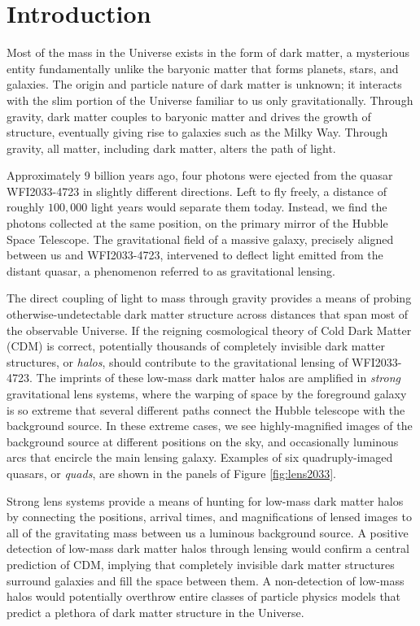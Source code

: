 
%
%

\chapter{Introduction}

\indent Most of the mass in the Universe exists in the form of dark matter, a mysterious entity fundamentally unlike the baryonic matter that forms planets, stars, and galaxies. The origin and particle nature of dark matter is unknown; it interacts with the slim portion of the Universe familiar to us only gravitationally. Through gravity, dark matter couples to baryonic matter and drives the growth of structure, eventually giving rise to galaxies such as the Milky Way. Through gravity, all matter, including dark matter, alters the path of light. 

Approximately 9 billion years ago, four photons were ejected from the quasar WFI2033-4723 in slightly different directions. Left to fly freely, a distance of roughly $100,000$ light years would separate them today. Instead, we find the photons collected at the same position, on the primary mirror of the Hubble Space Telescope. The gravitational field of a massive galaxy, precisely aligned between us and WFI2033-4723, intervened to deflect light emitted from the distant quasar, a phenomenon referred to as gravitational lensing. 

The direct coupling of light to mass through gravity provides a means of probing otherwise-undetectable dark matter structure across distances that span most of the observable Universe. If the reigning cosmological theory of Cold Dark Matter (CDM) is correct, potentially thousands of completely invisible dark matter structures, or \textit{halos}, should contribute to the gravitational lensing of WFI2033-4723. The imprints of these low-mass dark matter halos are amplified in \textit{strong} gravitational lens systems, where the warping of space by the foreground galaxy is so extreme that several different paths connect the Hubble telescope with the background source. In these extreme cases, we see highly-magnified images of the background source at different positions on the sky, and occasionally luminous arcs that encircle the main lensing galaxy. Examples of six quadruply-imaged quasars, or \textit{quads}, are shown in the panels of Figure \ref{fig:lens2033}.

Strong lens systems provide a means of hunting for low-mass dark matter halos by connecting the positions, arrival times, and magnifications of lensed images to all of the gravitating mass between us a luminous background source. A positive detection of low-mass dark matter halos through lensing would confirm a central prediction of CDM, implying that completely invisible dark matter structures surround galaxies and fill the space between them. A non-detection of low-mass halos would potentially overthrow entire classes of particle physics models that predict a plethora of dark matter structure in the Universe. 

